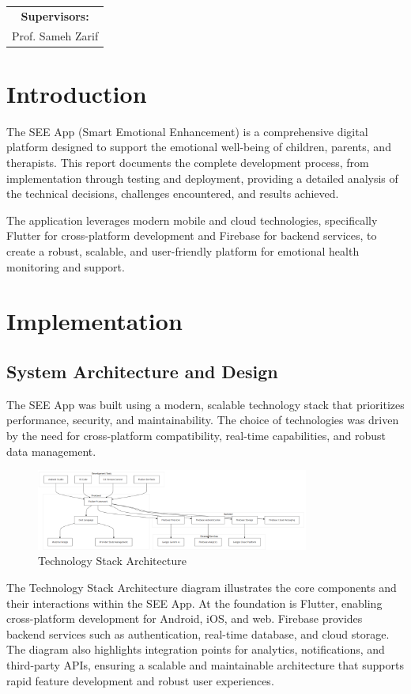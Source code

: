 ﻿\documentclass[12pt,a4paper]{article}
\newcommand{\chaptertitle}[1]{\section{#1}}
\newcommand{\sectiontitle}[1]{\subsection{#1}}
\begin{document}
\begin{titlepage}
    \begin{tabular}{c}
        \textbf{Supervisors:} \\
        Prof. Sameh Zarif \\
    \end{tabular}

\end{titlepage}

\tableofcontents
\newpage

\listoffigures
\newpage

\setcounter{section}{4}

\chaptertitle{Introduction}

The SEE App (Smart Emotional Enhancement) is a comprehensive digital platform designed to support the emotional well-being of children, parents, and therapists. This report documents the complete development process, from implementation through testing and deployment, providing a detailed analysis of the technical decisions, challenges encountered, and results achieved.

The application leverages modern mobile and cloud technologies, specifically Flutter for cross-platform development and Firebase for backend services, to create a robust, scalable, and user-friendly platform for emotional health monitoring and support.

\newpage

\chaptertitle{Implementation}

\sectiontitle{System Architecture and Design}

The SEE App was built using a modern, scalable technology stack that prioritizes performance, security, and maintainability. The choice of technologies was driven by the need for cross-platform compatibility, real-time capabilities, and robust data management.

\begin{figure}[H]
    \centering
    \includegraphics[width=0.8\textwidth,height=0.24\textwidth,keepaspectratio]{redrawn_diagrams/Figure1_Technology_Stack_Architecture.png}
    \caption{Technology Stack Architecture}
    \label{fig:tech-stack}
\end{figure}
\vspace{0.5em}
The Technology Stack Architecture diagram illustrates the core components and their interactions within the SEE App. At the foundation is Flutter, enabling cross-platform development for Android, iOS, and web. Firebase provides backend services such as authentication, real-time database, and cloud storage. The diagram also highlights integration points for analytics, notifications, and third-party APIs, ensuring a scalable and maintainable architecture that supports rapid feature development and robust user experiences.
\end{document}
